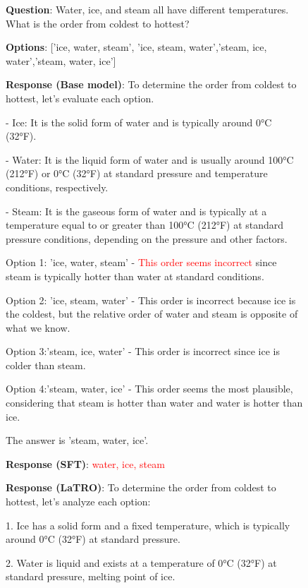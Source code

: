 \begin{figure}
    \centering
    \begin{bluetextbox}
        \textbf{Question}: Water, ice, and steam all have different temperatures. What is the order from coldest to hottest?
        
        \textbf{Options}: ['ice, water, steam', 'ice, steam, water','steam, ice, water','steam, water, ice']

        \textbf{Response (Base model)}: To determine the order from coldest to hottest, let's evaluate each option.

        - Ice: It is the solid form of water and is typically around 0°C (32°F).
        
        - Water: It is the liquid form of water and is usually around 100°C (212°F) or 0°C (32°F) at standard pressure and temperature conditions, respectively.
        
        - Steam: It is the gaseous form of water and is typically at a temperature equal to or greater than 100°C (212°F) at standard pressure conditions, depending on the pressure and other factors.

        Option 1: 'ice, water, steam' - \textcolor{red}{This order seems incorrect} since steam is typically hotter than water at standard conditions.
        
        Option 2: 'ice, steam, water' - This order is incorrect because ice is the coldest, but the relative order of water and steam is opposite of what we know.
        
        Option 3:'steam, ice, water' - This order is incorrect since ice is colder than steam.
        
        Option 4:'steam, water, ice' - This order seems the most plausible, considering that steam is hotter than water and water is hotter than ice.

        The answer is 'steam, water, ice'.
        
    \textbf{Response (SFT)}: \textcolor{red}{water, ice, steam}

    \textbf{Response (LaTRO)}:
    To determine the order from coldest to hottest, let's analyze each option:
    
    1. Ice has a solid form and a fixed temperature, which is typically around 0°C (32°F) at standard pressure.
    
    2. Water is liquid and exists at a temperature of 0°C (32°F) at standard pressure, melting point of ice.
    

\end{bluetextbox}
\end{figure}
